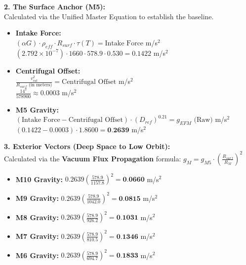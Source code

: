 \documentclass[11pt, a4paper]{article}
\begin{document}
  \vspace{1.0em}
  \noindent \textbf{2. The Surface Anchor (M5):} \\
  \hspace*{1em} Calculated via the Unified Master Equation to establish the baseline.
  \begin{itemize}
    \item \textbf{Intake Force:} \\[0.5em]
    \hspace*{2em} $(\alpha G) \cdot \rho_{eff} \cdot R_{surf} \cdot \tau(T) = \text{Intake Force}$ m/s$^2$ \\[1em]
    \hspace*{2em} $(2.792 \times 10^{-7}) \cdot 1660 \cdot 578.9 \cdot 0.530 = 0.1422$ m/s$^2$
    
    \item \textbf{Centrifugal Offset:} \\[0.5em]
    \hspace*{2em} $\frac{v_{rot}^2}{R_{surf} \text{ (in meters)}} = \text{Centrifugal Offset}$ m/s$^2$ \\[1em]
    \hspace*{2em} $\frac{14^2}{578900} \approx 0.0003$ m/s$^2$
    
    \item \textbf{M5 Gravity:} \\[0.5em]
    \hspace*{2em} $(\text{Intake Force} - \text{Centrifugal Offset}) \cdot (D_{ref})^{0.21} = g_{EFM} \text{ (Raw)}$ m/s$^2$ \\[1em]
    \hspace*{2em} $(0.1422 - 0.0003) \cdot 1.8600 = \textbf{0.2639}$ m/s$^2$
  \end{itemize}

  \clearpage
  \noindent \textbf{3. Exterior Vectors (Deep Space to Low Orbit):} \\
  \hspace*{1em} Calculated via the \textbf{Vacuum Flux Propagation} formula: $g_M = g_{M5} \cdot \left( \frac{R_{surf}}{R_M} \right)^2$
  \begin{itemize}
    \item \textbf{M10 Gravity:} $0.2639 \left( \frac{578.9}{1157.8} \right)^2 = \textbf{0.0660}$ m/s$^2$
    \item \textbf{M9 Gravity:} $0.2639 \left( \frac{578.9}{1042.0} \right)^2 = \textbf{0.0815}$ m/s$^2$
    \item \textbf{M8 Gravity:} $0.2639 \left( \frac{578.9}{926.2} \right)^2 = \textbf{0.1031}$ m/s$^2$
    \item \textbf{M7 Gravity:} $0.2639 \left( \frac{578.9}{810.5} \right)^2 = \textbf{0.1346}$ m/s$^2$
    \item \textbf{M6 Gravity:} $0.2639 \left( \frac{578.9}{694.7} \right)^2 = \textbf{0.1833}$ m/s$^2$
  \end{itemize}
\end{document}

